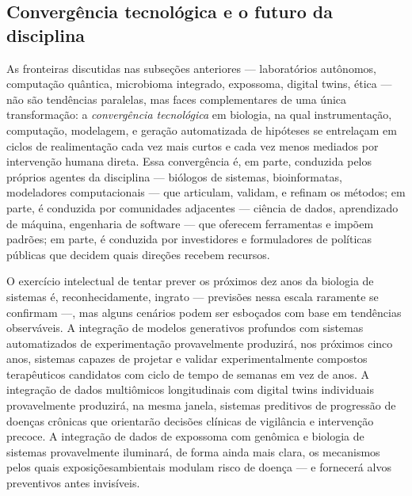 \subsection{Convergência tecnológica e o futuro da disciplina}
\label{sec:15-convergencia}

As fronteiras discutidas nas subseções anteriores --- laboratórios autônomos, computação quântica, microbioma integrado, expossoma, digital twins, ética --- não são tendências paralelas, mas faces complementares de uma única transformação: a \emph{convergência tecnológica} em biologia, na qual instrumentação, computação, modelagem, e geração automatizada de hipóteses se entrelaçam em ciclos de realimentação cada vez mais curtos e cada vez menos mediados por intervenção humana direta. Essa convergência é, em parte, conduzida pelos próprios agentes da disciplina --- biólogos de sistemas, bioinformatas, modeladores computacionais --- que articulam, validam, e refinam os métodos; em parte, é conduzida por comunidades adjacentes --- ciência de dados, aprendizado de máquina, engenharia de software --- que oferecem ferramentas e impõem padrões; em parte, é conduzida por investidores e formuladores de políticas públicas que decidem quais direções recebem recursos.

O exercício intelectual de tentar prever os próximos dez anos da biologia de sistemas é, reconhecidamente, ingrato --- previsões nessa escala raramente se confirmam ---, mas alguns cenários podem ser esboçados com base em tendências observáveis. A integração de modelos generativos profundos com sistemas automatizados de experimentação provavelmente produzirá, nos próximos cinco anos, sistemas capazes de projetar e validar experimentalmente compostos terapêuticos candidatos com ciclo de tempo de semanas em vez de anos. A integração de dados multiômicos longitudinais com digital twins individuais provavelmente produzirá, na mesma janela, sistemas preditivos de progressão de doenças crônicas que orientarão decisões clínicas de vigilância e intervenção precoce. A integração de dados de expossoma com genômica e biologia de sistemas provavelmente iluminará, de forma ainda mais clara, os mecanismos pelos quais exposiçõesambientais modulam risco de doença --- e fornecerá alvos preventivos antes invisíveis.

